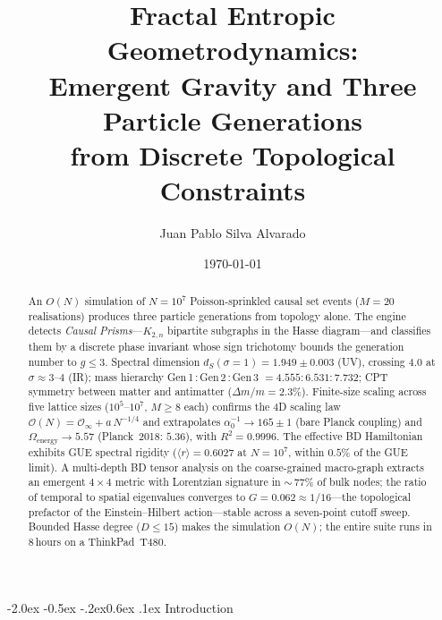 \documentclass[aps,prl,twocolumn,superscriptaddress,nofootinbib,amsmath,amssymb,floatfix]{revtex4-2}
\makeatletter
\def\sec@upcase#1{\uppercase{#1}}
\renewcommand\section{\@startsection{section}{1}{\z@}%
  {-2.0ex \@plus -0.5ex \@minus -.2ex}{0.6ex \@plus .1ex}%
  {\normalfont\small\bfseries\centering\sec@upcase}}
\makeatother
\begin{document}
\title{Fractal Entropic Geometrodynamics: \\ Emergent Gravity and Three Particle Generations \\ from Discrete Topological Constraints}

\author{Juan Pablo Silva Alvarado}

\date{\today}

\begin{abstract}
An $O(N)$ simulation of $N = 10^7$ Poisson-sprinkled causal set events
($M = 20$ realisations) produces three particle generations from topology alone.
The engine detects \emph{Causal Prisms}---$K_{2,n}$ bipartite subgraphs in
the Hasse diagram---and classifies them by a discrete phase invariant whose
sign trichotomy bounds the generation number to $g \leq 3$.
Spectral dimension $d_S(\sigma{=}1) = 1.949 \pm 0.003$ (UV), crossing $4.0$
at $\sigma \approx 3$--$4$ (IR);
mass hierarchy Gen\,1\,:\,Gen\,2\,:\,Gen\,3 $= 4.555 : 6.531 : 7.732$;
CPT symmetry between matter and antimatter ($\Delta m/m = 2.3\%$).
Finite-size scaling across five lattice sizes ($10^5$--$10^7$,
$M \geq 8$ each) confirms the 4D scaling law
$\mathcal{O}(N) = \mathcal{O}_\infty + a\,N^{-1/4}$
and extrapolates
$\alpha^{-1}_0 \to 165 \pm 1$ (bare Planck coupling) and
$\Omega_{\mathrm{energy}} \to 5.57$ (Planck~2018: $5.36$),
with $R^2 = 0.9996$.
The effective BD Hamiltonian exhibits GUE spectral rigidity
($\langle r \rangle = 0.6027$ at $N = 10^7$, within $0.5\%$ of
the GUE limit).
A multi-depth BD tensor analysis on the coarse-grained macro-graph
extracts an emergent $4{\times}4$ metric with Lorentzian signature
in ${\sim}\,77\%$ of bulk nodes; the ratio of temporal to spatial
eigenvalues converges to $G = 0.062 \approx 1/16$---the topological
prefactor of the Einstein--Hilbert action---stable across a
seven-point cutoff sweep.
Bounded Hasse degree ($D \leq 15$) makes the simulation $O(N)$;
the entire suite runs in 8\,hours on a ThinkPad~T480.
\end{abstract}

\maketitle

\section{Introduction}\label{sec:intro}
\end{document}
